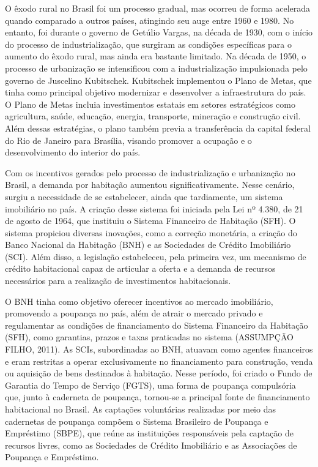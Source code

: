 \documentclass[
  12pt,
  a4paper,
]{scrreprt}
\begin{document}
O êxodo rural no Brasil foi um processo gradual, mas ocorreu de forma
acelerada quando comparado a outros países, atingindo seu auge entre
1960 e 1980. No entanto, foi durante o governo de Getúlio Vargas, na
década de 1930, com o início do processo de industrialização, que
surgiram as condições específicas para o aumento do êxodo rural, mas
ainda era bastante limitado. Na década de 1950, o processo de
urbanização se intensificou com a industrialização impulsionada pelo
governo de Juscelino Kubitschek. Kubitschek implementou o Plano de
Metas, que tinha como principal objetivo modernizar e desenvolver a
infraestrutura do país. O Plano de Metas incluia investimentos estatais
em setores estratégicos como agricultura, saúde, educação, energia,
transporte, mineração e construção civil. Além dessas estratégias, o
plano também previa a transferência da capital federal do Rio de Janeiro
para Brasília, visando promover a ocupação e o desenvolvimento do
interior do país.

\vspace{12pt}

Com os incentivos gerados pelo processo de industrialização e
urbanização no Brasil, a demanda por habitação aumentou
significativamente. Nesse cenário, surgiu a necessidade de se
estabelecer, ainda que tardiamente, um sistema imobiliário no país. A
criação desse sistema foi iniciada pela Lei nº 4.380, de 21 de agosto de
1964, que instituiu o Sistema Financeiro de Habitação (SFH). O sistema
propiciou diversas inovações, como a correção monetária, a criação do
Banco Nacional da Habitação (BNH) e as Sociedades de Crédito Imobiliário
(SCI). Além disso, a legislação estabeleceu, pela primeira vez, um
mecanismo de crédito habitacional capaz de articular a oferta e a
demanda de recursos necessários para a realização de investimentos
habitacionais.

\vspace{12pt}

O BNH tinha como objetivo oferecer incentivos ao mercado imobiliário,
promovendo a poupança no país, além de atrair o mercado privado e
regulamentar as condições de financiamento do Sistema Financeiro da
Habitação (SFH), como garantias, prazos e taxas praticadas no sistema
(ASSUMPÇÃO FILHO, 2011). As SCIs, subordinadas ao BNH, atuavam como
agentes financeiros e eram restritas a operar exclusivamente no
financiamento para construção, venda ou aquisição de bens destinados à
habitação. Nesse período, foi criado o Fundo de Garantia do Tempo de
Serviço (FGTS), uma forma de poupança compulsória que, junto à caderneta
de poupança, tornou-se a principal fonte de financiamento habitacional
no Brasil. As captações voluntárias realizadas por meio das cadernetas
de poupança compõem o Sistema Brasileiro de Poupança e Empréstimo
(SBPE), que reúne as instituições responsáveis pela captação de recursos
livres, como as Sociedades de Crédito Imobiliário e as Associações de
Poupança e Empréstimo.
\end{document}
